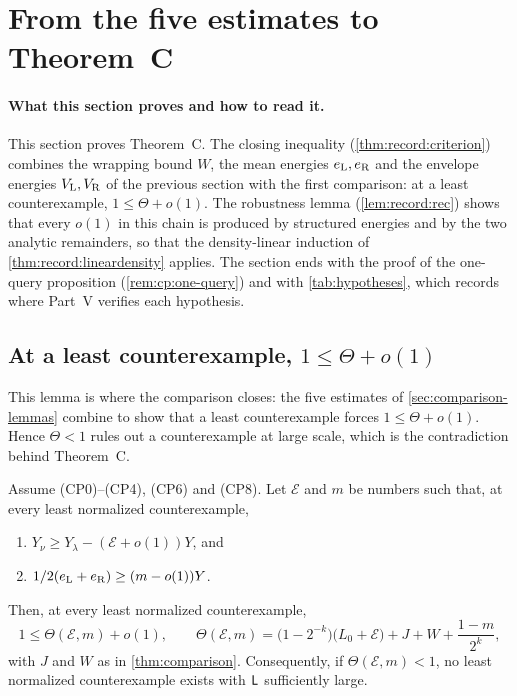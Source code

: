 \providecommand{\PushA}{\frac{5422587}{6103515625}}
\providecommand{\PushK}{890666}
\providecommand{\PushTheta}{0.99999999997327}
\section{From the five estimates to Theorem~C}
\label{sec:comparison-proof}

\paragraph{What this section proves and how to read it.}
This section proves Theorem~C. The closing inequality
(\cref{thm:record:criterion}) combines the wrapping bound $W$, the mean energies $e_{\rm L},e_{\rm R}$ and the
envelope energies $V_{\rm L},V_{\rm R}$ of the previous section with the first comparison: at a
least counterexample, $1\le\Theta+o(1)$. The robustness lemma
(\cref{lem:record:rec}) shows that every $o(1)$ in this chain is produced by
structured energies and by the two analytic remainders, so that the
density-linear induction of \cref{thm:record:lineardensity} applies. The
section ends with the proof of the one-query proposition
(\cref{rem:cp:one-query}) and with \cref{tab:hypotheses}, which records where
Part~V verifies each hypothesis.

\subsection{At a least counterexample, \texorpdfstring{$1\le\Theta+o(1)$}{1 <= Theta+o(1)}}\label{subsec:cp:closing}

This lemma is where the comparison closes: the five estimates of
\cref{sec:comparison-lemmas} combine to show that a least
counterexample forces $1\le\Theta+o(1)$. Hence $\Theta<1$ rules out
a counterexample at large scale, which is the contradiction behind
Theorem~C.

\begin{lemma}\label{thm:record:criterion}
Assume (CP0)--(CP4), (CP6) and (CP8). Let $\mathcal E$ and $m$ be numbers such
that, at every least normalized counterexample,
\begin{enumerate}[label=(\roman*)]
\item $Y_\nu\ge Y_\lambda-(\mathcal E+o(1))Y$, and
\item $\frac12(e_{\rm L}+e_{\rm R})\ge(m-o(1))Y$.
\end{enumerate}
Then, at every least normalized counterexample,
\begin{equation}\label{eq:record:criterion}
 1\le\Theta(\mathcal E,m)+o(1),\qquad
 \Theta(\mathcal E,m)=\bigl(1-2^{-k}\bigr)\bigl(L_0+\mathcal E\bigr)+J+W
 +\frac{1-m}{2^k},
\end{equation}
with $J$ and $W$ as in \cref{thm:comparison}. Consequently, if
$\Theta(\mathcal E,m)<1$, no least normalized counterexample
exists with $\Lsc$ sufficiently large.
\end{lemma}


